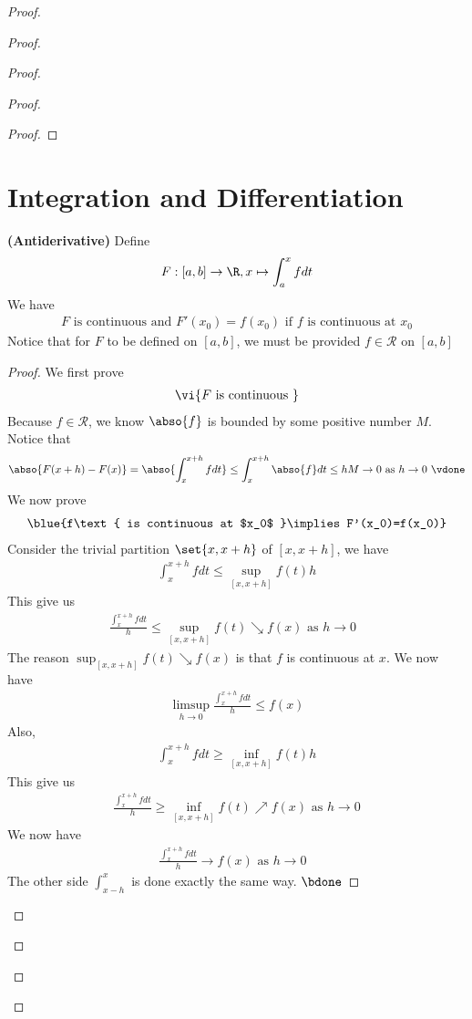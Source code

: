 \documentclass{report}
\begin{document}
\begin{proof}
\begin{proof}
\begin{proof}
\begin{proof}
\begin{proof}
\end{proof}
\section{Integration and Differentiation}
\begin{theorem}
\label{7.4.1}
  \textbf{(Antiderivative)} Define
  \begin{align*}
  F:[a,b]\rightarrow \R, x \mapsto  \int_a^x fdt
  \end{align*}
We have 
\begin{align*}
F\text{ is continuous and $F'(x_0)=f(x_0)$ if $f$ is continuous at $x_0$}
\end{align*}
Notice that for $F$ to be defined on  $[a,b]$, we must be provided $f\in \mathscr{R}$ on $[a,b]$ 
\end{theorem}
\begin{proof}
We first prove 
\begin{align*}
\vi{F\text{ is continuous }}
\end{align*}
Because $f\in \mathscr{R}$, we know $\abso{f}$ is bounded by some positive number $M$.\\

Notice that 
\begin{align*}
  \abso{F(x+h)-F(x)}=\abso{\int_x^{x+h} f dt} \leq \int_x^{x+h} \abso{f}dt \leq hM \to 0 \text{ as $h \to 0$ }\vdone
\end{align*}
We now prove 
\begin{align*}
  \blue{f\text{ is continuous at $x_0$ }\implies F'(x_0)=f(x_0)}
\end{align*}
Consider the trivial partition $\set{x,x+h}$ of $[x,x+h]$, we have 
\begin{align*}
\int_x^{x+h}fdt \leq \sup_{[x,x+h]}f(t)h
\end{align*}
This give us 
\begin{align*}
  \frac{\int_x^{x+h}fdt}{h}\leq \sup_{[x,x+h]}f(t) \searrow f(x) \text{ as $h \to 0$ }
\end{align*}
The reason $\sup_{[x,x+h]}f(t) \searrow f(x)$ is that $f$ is continuous at  $x$. We now have 
\begin{align*}
  \limsup_{h \to 0}  \frac{\int_x^{x+h}fdt}{h} \leq f(x) 
\end{align*}
Also, 
\begin{align*}
\int_{x}^{x+h} fdt \geq \inf_{[x,x+h]}f(t)h
\end{align*}
This give us 
\begin{align*}
\frac{\int_x^{x+h}fdt}{h}\geq \inf_{[x,x+h]}f(t)\nearrow f(x)\text{ as }h \to 0
\end{align*}
We now have 
\begin{align*}
\frac{\int_x^{x+h}fdt}{h} \to f(x) \text{ as $h\to 0$ }
\end{align*}
The other side $\int_{x-h}^x$ is done exactly the same way. $\bdone$


\end{proof}
\end{proof}
\end{proof}
\end{proof}
\end{proof}
\end{document}
